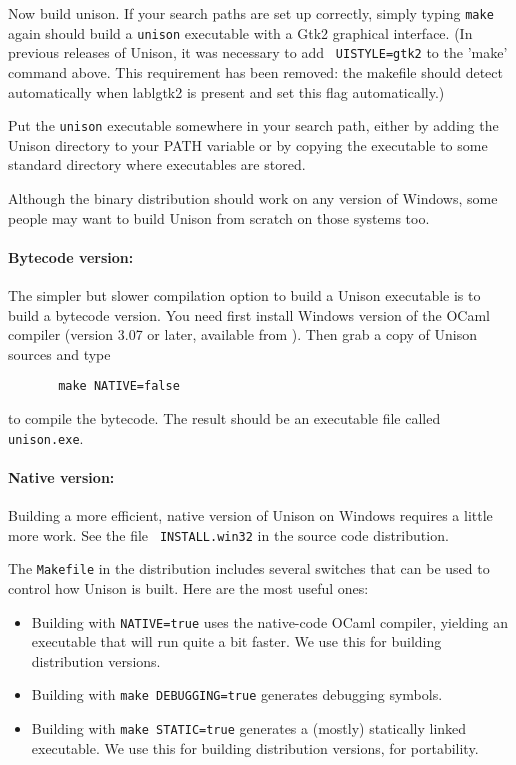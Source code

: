 \documentclass{article}
\begin{document}
Now build unison.  If your search paths are set up correctly, simply typing
{\tt make}
again should build a \verb|unison| executable with a Gtk2 graphical
interface.  (In previous releases of Unison, it was necessary to add {\tt
  UISTYLE=gtk2} to the 'make' command above.  This requirement has been
removed: the makefile should detect automatically when lablgtk2 is
present and set this flag automatically.)  

Put the \verb|unison| executable somewhere in your search path, either
by adding the Unison directory to your PATH variable or by copying the
executable to some standard directory where executables are stored.


Although the binary distribution should work on any version of Windows,
some people may want to build Unison from scratch on those systems too.

\paragraph{Bytecode version:} The simpler but slower compilation option
to build a Unison executable is to build a bytecode version.  You need
first install Windows version of the OCaml compiler (version 3.07 or
later, available from ).  Then grab a copy
of Unison sources and type  
\begin{verbatim}
       make NATIVE=false
\end{verbatim}
to compile the bytecode.  The result should be an executable file called
\verb|unison.exe|. 

\paragraph{Native version:} Building a more efficient, native version of
Unison on Windows requires a little more work.  See the file {\tt
  INSTALL.win32} in the source code distribution.



The \verb|Makefile| in the distribution includes several switches that
can be used to control how Unison is built.  Here are the most useful
ones:
\begin{itemize}
\item Building with \verb|NATIVE=true| uses the native-code OCaml
compiler, yielding an executable that will run quite a bit faster. We use
this for building distribution versions.
\item Building with \verb|make DEBUGGING=true| generates debugging
symbols. 
\item Building with \verb|make STATIC=true| generates a (mostly)
statically linked executable.  We use this for building distribution
versions, for portability.
\end{itemize}
\end{document}
